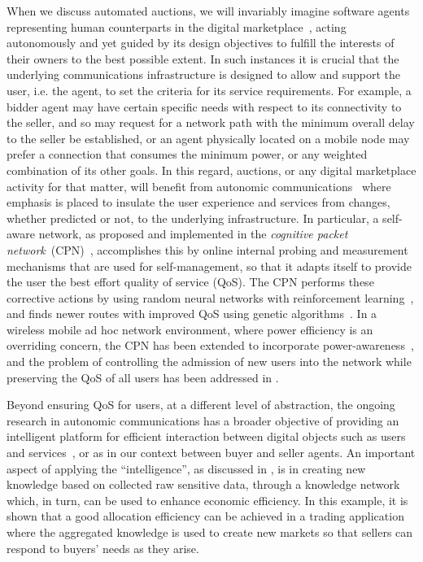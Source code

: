 \documentclass{article}
\begin{document}
When we discuss automated auctions, we will invariably imagine
software agents representing human counterparts in the digital
marketplace~\cite{maes99}, acting autonomously and yet guided by
its design objectives to fulfill the interests of their owners to
the best possible extent. In such instances it is crucial that the
underlying communications infrastructure is designed to allow and
support the user, i.e. the agent, to set the criteria for its
service requirements. For example, a bidder agent may have certain
specific needs with respect to its connectivity to the seller, and
so may request for a network path with the minimum overall delay
to the seller be established, or an agent physically located on a
mobile node may prefer a connection that consumes the minimum
power, or any weighted combination of its other goals. In this
regard, auctions, or any digital marketplace activity for that
matter, will benefit from autonomic
communications~\cite{Dobson_etal_06} where emphasis is placed to
insulate the user experience and services from changes, whether
predicted or not, to the underlying infrastructure. In particular,
a self-aware network, as proposed and implemented in the
\emph{cognitive packet network}~(CPN)~\cite{Gelenbe_etal_Nagoya,
Gelenbe_Gellman_Su_ISCC03, Gelenbe-Gellman-Lent-Liu04},
accomplishes this by online internal probing and measurement
mechanisms that are used for self-management, so that it adapts
itself to provide the user the best effort quality of service
(QoS). The CPN performs these corrective actions by using random
neural networks with reinforcement
learning~\cite{Gelenbe_01_CompNetw_CPN, Gelenbe_Mascots02,
Gelenbe_Lent_Nunez_04}, and finds newer routes with improved QoS
using genetic algorithms~\cite{Gelenbe_Liu06_workshop,
Gelenbe_Liu06_GeneticAlgorithmsRouteDiscovery}. In a wireless
mobile ad hoc network environment, where power efficiency is an
overriding concern, the CPN has been extended to incorporate
power-awareness~\cite{Gelenbe-Lent_2004}, and the problem of
controlling the admission of new users into the network while
preserving the QoS of all users has been addressed in
\cite{gelenbe_sakellari_08}.

Beyond ensuring QoS for users, at a different level of
abstraction, the ongoing research in autonomic communications has
a broader objective of providing an intelligent platform for
efficient interaction between digital objects such as users and
services~\cite{Gelenbe05_UsersServicesIntNetworks}, or as in our
context between buyer and seller agents. An important aspect of
applying the ``intelligence'', as discussed in
\cite{ferdinando_etal08}, is in creating new knowledge based on
collected raw sensitive data, through a knowledge network which,
in turn, can be used to enhance economic efficiency. In this
example, it is shown that a good allocation efficiency can be
achieved in a trading application where the aggregated knowledge
is used to create new markets so that sellers can respond to
buyers' needs as they arise.
\end{document}
